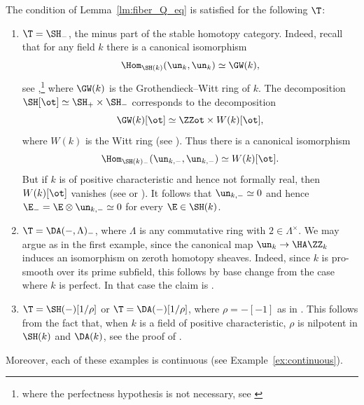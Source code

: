 \begin{ex}\label{ex:keylemma}
The condition of Lemma~\ref{lm:fiber_Q_eq} is satisfied for the following $\T$:
\begin{enumerate}
\item\label{item:keylemma/SHminus}
$\T=\SH_-$, the minus part of the stable homotopy category.
Indeed, recall that for any field $k$ there is a canonical isomorphism
\[\Hom_{\SH(k)}(\un_k,\un_k) \simeq \GW(k),\]
see \cite[Cor.\,1.25]{MorelA1},\footnote{where the perfectness hypothesis is not necessary, see \cite[Th.\,10.12]{BachmannHoyois}} where $\GW(k)$ is the Grothendieck--Witt ring of $k$.
The decom\-po\-sition $\SH[\ot] \simeq \SH_+ \times \SH_-$ corresponds to the decomposition
\[ \GW(k)[\ot] \simeq \ZZot \times W(k)[\ot], \]
where $W(k)$ is the Witt ring (see \cite[Eq.\,(3.1)]{MorelA1}).
Thus there is a canonical isomorphism
\[ \Hom_{\SH(k)_-}(\un_{k,-},\un_{k,-}) \simeq W(k)[\ot]. \]
But if $k$ is of positive characteristic and hence not formally real, then $W(k)[\ot]$ vanishes (see \eg \cite[\S31.A]{EKM} or \cite[Chap.\,VIII, Lem.\,3.4]{LamQuadratic}).
It follows that $\un_{k,-} \simeq 0$ and hence $\E_- = \E \otimes \un_{k,-} \simeq 0$ for every $\E \in \SH(k)$.

\item\label{item:keylemma/DAminus}
$\T=\DA(-, \Lambda)_-$, where $\Lambda$ is any commutative ring with $2 \in \Lambda^\times$.
We may argue as in the first example, since the canonical map $\un_k \to \HA \ZZ_k$ induces an isomorphism on zeroth homotopy sheaves.
Indeed, since $k$ is pro-smooth over its prime subfield, this follows by base change from the case where $k$ is perfect.
In that case the claim is \cite[Th.\,6.37]{MorelA1}.

\item\label{item:keylemma/SHrhoinv}
$\T=\SH(-)[1/\rho]$ or $\T=\DA(-)[1/\rho]$, where $\rho=-[-1]$ as in \cite[Cor.\,19]{Bachmann}.
This follows from the fact that, when $k$ is a field of positive characteristic, $\rho$ is nilpotent in $\SH(k)$ and $\DA(k)$, see the proof of \cite[Cor.\,32]{Bachmann}.
\end{enumerate}
Moreover, each of these examples is continuous (see Example~\ref{ex:continuous}).
\end{ex}


